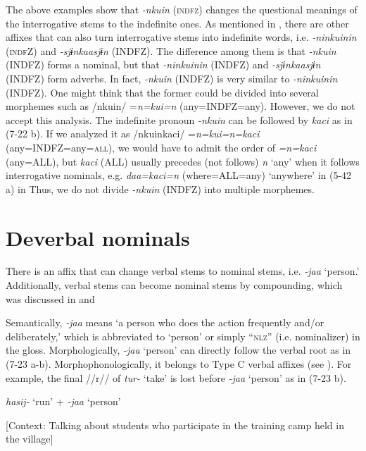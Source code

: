 The above examples show that \textit{{}-nkuin} (\textsc{indfz}) changes the questional meanings of the interrogative stems to the indefinite ones. As mentioned in , there are other affixes that can also turn interrogative stems into indefinite words, i.e. \textit{{}-ninkuinin} (\textsc{indf}Z) and \textit{{}-sjɨnkaasjɨn} (INDFZ). The difference among them is that \textit{{}-nkuin} (INDFZ) forms a nominal, but that \textit{{}-ninkuinin} (INDFZ) and \textit{{}-sjɨnkaasjɨn} (INDFZ) form adverbs. In fact, \textit{{}-nkuin} (INDFZ) is very similar to \textit{{}-ninkuinin} (INDFZ). One might think that the former could be divided into several morphemes such as /nkuin/ =\textit{n=kui=n} (any=INDFZ=any). However, we do not accept this analysis. The indefinite pronoun \textit{{}-nkuin} can be followed by \textit{kaci} as in (7-22 b). If we analyzed it as /nkuinkaci/ =\textit{n=kui=n=kaci} (any=INDFZ=any=\textsc{all}), we would have to admit the order of \textit{=n=kaci} (any=ALL), but \textit{kaci} (ALL) usually precedes (not follows) \textit{n} ‘any’ when it follows interrogative nominals, e.g. \textit{daa=kaci=n} (where=ALL=any) ‘anywhere’ in (5-42 a) in  Thus, we do not divide \textit{{}-nkuin} (INDFZ) into multiple morphemes.

\section{Deverbal nominals}

There is an affix that can change verbal stems to nominal stems, i.e. \textit{{}-jaa} ‘person.’ Additionally, verbal stems can become nominal stems by compounding, which was discussed in  and 

Semantically, \textit{{}-jaa} means ‘a person who does the action frequently and/or deliberately,’ which is abbreviated to ‘person’ or simply “\textsc{nlz}” (i.e. nominalizer) in the gloss. Morphologically, \textit{-jaa} ‘person’ can directly follow the verbal root as in (7-23 a-b). Morphophonologically, it belongs to Type C verbal affixes (see ). For example, the final //r// of \textit{tur-} ‘take’ is lost before \textit{{}-jaa} ‘person’ as in (7-23 b).

\ea \label{ex:7:23}\ea \label{ex:7:a}\textit{hasij-} ‘run’ + \textit{{}-jaa} ‘person’

    [Context: Talking about students who participate in the training camp held in the village]

